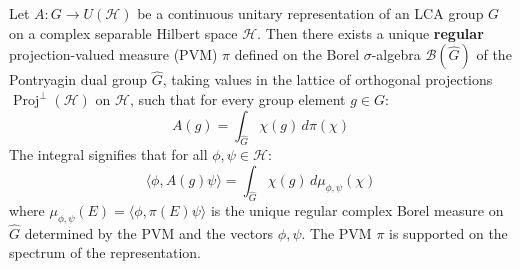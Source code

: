 \begin{theorem}
\label{thm:spectral_lca_fully_expanded}
Let $A: G \to U(\mathcal{H})$ be a continuous unitary representation of an LCA group $G$ on a complex separable Hilbert space $\mathcal{H}$. Then there exists a unique \textbf{regular} projection-valued measure (PVM) $\pi$ defined on the Borel $\sigma$-algebra $\mathcal{B}(\hat{G})$ of the Pontryagin dual group $\hat{G}$, taking values in the lattice of orthogonal projections $\operatorname{Proj}^{\perp}(\mathcal{H})$ on $\mathcal{H}$, such that for every group element $g \in G$:
\[ A(g) = \int_{\hat{G}} \chi(g) \, d\pi(\chi) \]
The integral signifies that for all $\phi, \psi \in \mathcal{H}$:
\[ \langle \phi, A(g)\psi \rangle = \int_{\hat{G}} \chi(g) \, d\mu_{\phi,\psi}(\chi) \]
where $\mu_{\phi,\psi}(E) = \langle \phi, \pi(E)\psi \rangle$ is the unique regular complex Borel measure on $\hat{G}$ determined by the PVM and the vectors $\phi, \psi$. The PVM $\pi$ is supported on the spectrum of the representation.
\end{theorem}


